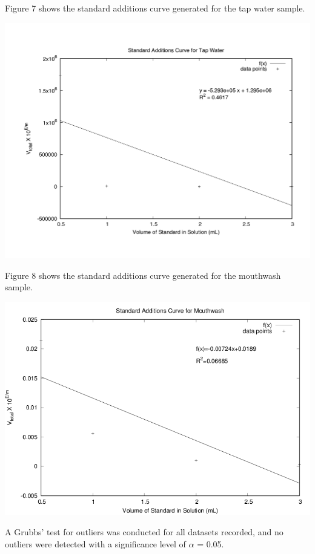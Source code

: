\documentclass{article}
\begin{document}
Figure 7 shows the standard additions curve generated for the tap water sample.
\begin{center}
    \includegraphics[scale=0.28]{std_tap}
\end{center}
\newpage

Figure 8 shows the standard additions curve generated for the mouthwash sample.
\begin{center}
    \includegraphics[scale=0.6]{std_mouthwash} 
\end{center}

A Grubbs' test for outliers was conducted for all datasets recorded, and no
outliers were detected with a significance level of $\alpha$ = 0.05.
\end{document}
